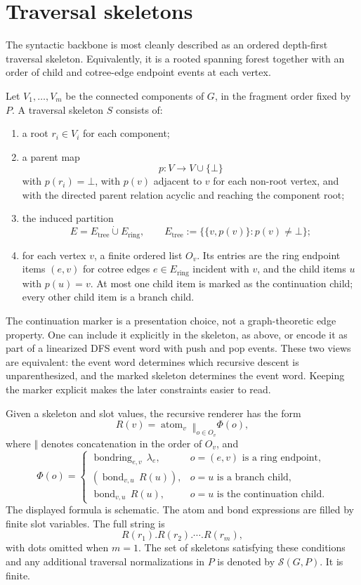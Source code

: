 \documentclass[10pt,a4paper]{article}
\newcommand{\calS}{\mathcal S}
\newcommand{\None}{\bot}
\newcommand{\Ring}{\mathrm{ring}}
\newcommand{\Tree}{\mathrm{tree}}
\newcommand{\dotcup}{\mathbin{\dot\cup}}
\theoremstyle{definition}
\theoremstyle{remark}
\begin{document}
	\section{Traversal skeletons}
	\label{s:skeleton}

	The syntactic backbone is most cleanly described as an ordered depth-first
	traversal skeleton.  Equivalently, it is a rooted spanning forest together with
	an order of child and cotree-edge endpoint events at each vertex.

	Let \(V_1,\ldots,V_m\) be the connected components of \(G\), in the fragment
	order fixed by \(P\).  A traversal skeleton \(S\) consists of:
	\begin{enumerate}[label=\textup{(S\arabic*)},leftmargin=2.5em]
		\item a root \(r_i\in V_i\) for each component;
		\item a parent map
		\[
		p:V\to V\cup\{\None\}
		\]
		with \(p(r_i)=\None\), with \(p(v)\) adjacent to \(v\) for each non-root vertex,
		and with the directed parent relation acyclic and reaching the component root;
		\item the induced partition
		\[
		E=E_{\Tree}\dotcup E_{\Ring},
		\qquad
		E_{\Tree}:=\{\{v,p(v)\}:p(v)\ne\None\};
		\]
		\item for each vertex \(v\), a finite ordered list \(O_v\).  Its entries are the
		ring endpoint items \((e,v)\) for cotree edges \(e\in E_{\Ring}\) incident with
		\(v\), and the child items \(u\) with \(p(u)=v\).  At most one child item is
		marked as the continuation child; every other child item is a branch child.
	\end{enumerate}
	The continuation marker is a presentation choice, not a graph-theoretic edge
	property.  One can include it explicitly in the skeleton, as above, or encode it
	as part of a linearized DFS event word with push and pop events.  These two
	views are equivalent: the event word determines which recursive descent is
	unparenthesized, and the marked skeleton determines the event word.  Keeping the
	marker explicit makes the later constraints easier to read.

	Given a skeleton and slot values, the recursive renderer has the form
	\[
	R(v)=\operatorname{atom}_v\;\mathop{\Vert}_{o\in O_v}\Phi(o),
	\]
	where \(\Vert\) denotes concatenation in the order of \(O_v\), and
	\[
	\Phi(o)=
	\begin{cases}
		\operatorname{bondring}_{e,v}\,\lambda_e,
		& o=(e,v)\text{ is a ring endpoint},\\[0.3em]
		(\operatorname{bond}_{v,u}\,R(u)),
		& o=u\text{ is a branch child},\\[0.3em]
		\operatorname{bond}_{v,u}\,R(u),
		& o=u\text{ is the continuation child}.
	\end{cases}
	\]
	The displayed formula is schematic.  The atom and bond expressions are filled by
	finite slot variables.  The full string is
	\[
	R(r_1).R(r_2).\cdots.R(r_m),
	\]
	with dots omitted when \(m=1\).  The set of skeletons satisfying these
	conditions and any additional traversal normalizations in \(P\) is denoted by
	\(\calS(G,P)\).  It is finite.
\end{document}
